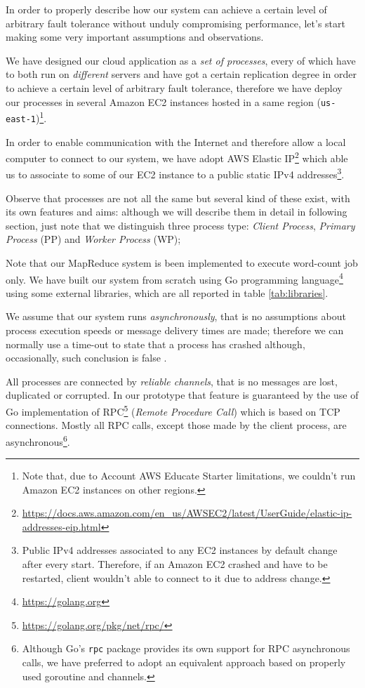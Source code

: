 \documentclass[sigchi]{acmart}
\begin{document}
In order to properly describe how our system can achieve a certain level of arbitrary fault tolerance without unduly compromising performance, let's start making some very important assumptions and observations.

We have designed our cloud application as a \textit{set of processes}, every of which have to both run on \textit{different} servers and have got a certain replication degree in order to achieve a certain level of arbitrary fault tolerance, therefore we have deploy our processes in several Amazon EC2 instances hosted in a same region (\texttt{us-east-1})\footnote{Note that, due to Account AWS Educate Starter limitations, we couldn't run Amazon EC2 instances on other regions.}.

In order to enable communication with the Internet and therefore allow a local computer to connect to our system, we have adopt AWS Elastic IP\footnote{\url{https://docs.aws.amazon.com/en_us/AWSEC2/latest/UserGuide/elastic-ip-addresses-eip.html}} which able us to associate to some of our EC2 instance to a public static IPv4 addresses\footnote{Public IPv4 addresses associated to any EC2 instances by default change after every start. Therefore, if an Amazon EC2 crashed and have to be restarted, client wouldn't able to connect to it due to address change.}.

Observe that processes are not all the same but several kind of these exist, with its own features and aims: although we will describe them in detail in following section, just note that we distinguish three process type: \textit{Client Process}, \textit{Primary Process} (PP) and \textit{Worker Process} (WP); 

Note that our MapReduce system is been implemented to execute word-count job only. We have built our system from scratch using Go programming language\footnote{\url{https://golang.org}} using some external libraries, which are all reported in table \ref{tab:libraries}. 

We assume that our system runs \textit{asynchronously}, that is no assumptions about process execution speeds or message delivery times are made; therefore we can normally use a time-out to state that a process has crashed although, occasionally, such conclusion is false \cite{SDCC}.

All processes are connected by \textit{reliable channels}, that is no messages are lost, duplicated or corrupted. In our prototype that feature is guaranteed  by the use of Go implementation of RPC\footnote{\url{https://golang.org/pkg/net/rpc/}} (\textit{Remote Procedure Call}) which is based on TCP connections. Mostly all RPC calls, except those made by the client process, are asynchronous\footnote{Although Go's \texttt{rpc} package provides its own support for RPC asynchronous calls, we have  preferred to adopt an equivalent approach based on properly used goroutine and channels.}.
\end{document}
